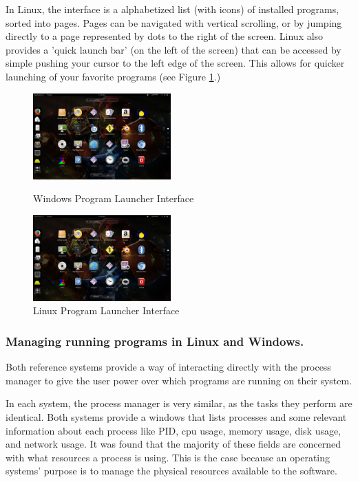 \documentclass[a4paper]{report}
\begin{document}
In Linux, the interface is a alphabetized list (with icons) of installed programs, sorted into pages. Pages can be navigated with vertical scrolling, or by jumping directly to a page represented by dots to the right of the screen. Linux also provides a 'quick launch bar' (on the left of the screen) that can be accessed by simple pushing your cursor to the left edge of the screen. This allows for quicker launching of your favorite programs (see Figure \ref{fig:LinLaunchScreen}.)


\begin{figure}[ht]
\centering
\begin{minipage}{.5\textwidth}
  \centering
  \includegraphics[width=200px]{images/Linux_Program_Launcher_Screenshot}
  \caption{Windows Program Launcher Interface}
  \label{fig:WinLaunchScreen}
\end{minipage}%
\begin{minipage}{.5\textwidth}
  \centering
  \includegraphics[width=200px]{images/Linux_Program_Launcher_Screenshot}
  \caption{Linux Program Launcher Interface}
  \label{fig:LinLaunchScreen}
\end{minipage}
\end{figure}


\subsubsection*{Managing running programs in Linux and Windows.}

Both reference systems provide a way of interacting directly with the process manager to give the user power over which programs are running on their system.

In each system, the process manager is very similar, as the tasks they perform are identical. Both systems provide a windows that lists processes and some relevant information about each process like PID, cpu usage, memory usage, disk usage, and network usage. It was found that the majority of these fields are concerned with what resources a process is using. This is the case because an operating systems' purpose is to manage the physical resources available to the software.
\end{document}
